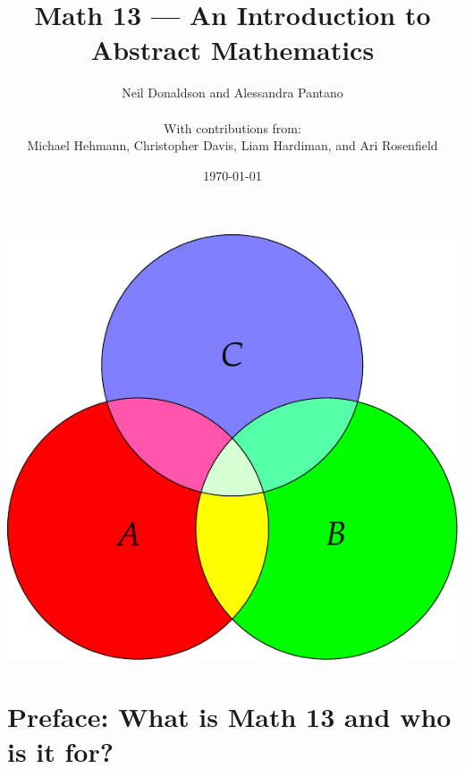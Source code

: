 \graphicspath{{1intro/asy}}


\title{Math 13 --- An Introduction to Abstract Mathematics}
\author{Neil Donaldson and Alessandra Pantano\\ \\ With contributions from:\\
Michael Hehmann, Christopher Davis, Liam Hardiman, and Ari Rosenfield}
\date{\today}
\maketitle
\thispagestyle{empty}

\vfill

\begin{center}
\includegraphics{intro-venndist}
\end{center}

\vfill\vfill\vfill

\clearpage




\tableofcontents

\clearpage

\section*{Preface: What is Math 13 and who is it for?}
\label{sec:preface}

